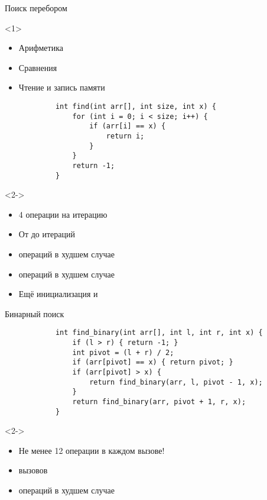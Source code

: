 \documentclass[aspectratio=169,14pt]{beamer}
\begin{document}
    \begin{frame}[fragile]{Поиск перебором}
        \begin{onlyenv}<1>
            \begin{itemize}
                \item Арифметика
                \item Сравнения
                \item Чтение и запись памяти
            \end{itemize}
        \end{onlyenv}
        \begin{verbatim}
            int find(int arr[], int size, int x) {
                for (int i = 0; i < size; i++) {
                    if (arr[i] == x) {
                        return i;
                    }
                }
                return -1;
            }
        \end{verbatim}
        \begin{onlyenv}<2->
            \begin{itemize}
                \item<2-> 4 операции на итерацию
                \item<3-> От  до  итераций
                \item<6->  операций в худшем случае
                \item<4-5>  операций в худшем случае
                \item<5> Ещё инициализация  и 
            \end{itemize}
        \end{onlyenv}
    \end{frame}

    \begin{frame}[fragile]{Бинарный поиск}
        \begin{verbatim}
            int find_binary(int arr[], int l, int r, int x) {
                if (l > r) { return -1; }
                int pivot = (l + r) / 2;
                if (arr[pivot] == x) { return pivot; }
                if (arr[pivot] > x) {
                    return find_binary(arr, l, pivot - 1, x);
                }
                return find_binary(arr, pivot + 1, r, x);
            }
        \end{verbatim}
        \begin{onlyenv}<2->
        \begin{itemize}
            \item<2-> Не менее 12 операции в каждом вызове!
            \item<3->  вызовов
            \item<4->  операций в худшем случае
        \end{itemize}
        \end{onlyenv}
    \end{frame}
\end{document}
